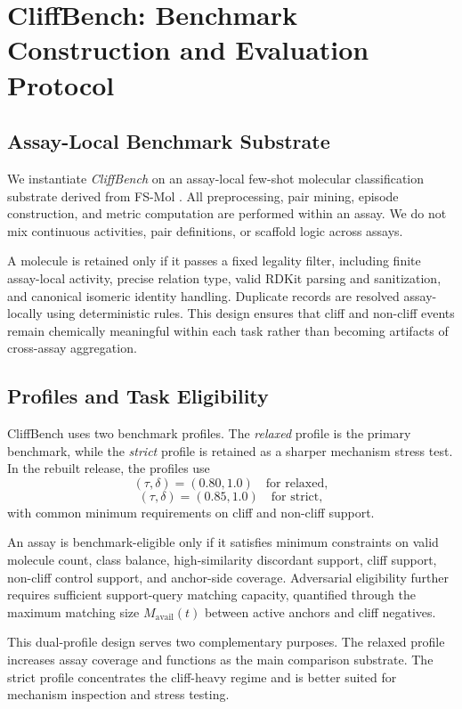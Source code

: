 \documentclass{article}
\begin{document}
\section{CliffBench: Benchmark Construction and Evaluation Protocol}

\subsection{Assay-Local Benchmark Substrate}

We instantiate \emph{CliffBench} on an assay-local few-shot molecular classification substrate derived from FS-Mol
\cite{fsmol}. All preprocessing, pair mining, episode construction, and metric computation are
performed within an assay. We do not mix continuous activities, pair definitions, or scaffold logic across assays.

A molecule is retained only if it passes a fixed legality filter, including finite assay-local activity, precise
relation type, valid RDKit parsing and sanitization, and canonical isomeric identity handling. Duplicate records
are resolved assay-locally using deterministic rules. This design ensures that cliff and non-cliff events remain
chemically meaningful within each task rather than becoming artifacts of cross-assay aggregation.

\subsection{Profiles and Task Eligibility}

CliffBench uses two benchmark profiles. The \emph{relaxed} profile is the primary benchmark, while the
\emph{strict} profile is retained as a sharper mechanism stress test. In the rebuilt release, the profiles use
\[
(\tau,\delta) = (0.80,1.0) \quad \text{for relaxed},
\]
\[
(\tau,\delta) = (0.85,1.0) \quad \text{for strict},
\]
with common minimum requirements on cliff and non-cliff support.

An assay is benchmark-eligible only if it satisfies minimum constraints on valid molecule count, class balance,
high-similarity discordant support, cliff support, non-cliff control support, and anchor-side coverage.
Adversarial eligibility further requires sufficient support-query matching capacity, quantified through the
maximum matching size $M_{\mathrm{avail}}(t)$ between active anchors and cliff negatives.

This dual-profile design serves two complementary purposes. The relaxed profile increases assay coverage and
functions as the main comparison substrate. The strict profile concentrates the cliff-heavy regime and is better
suited for mechanism inspection and stress testing.
\end{document}
